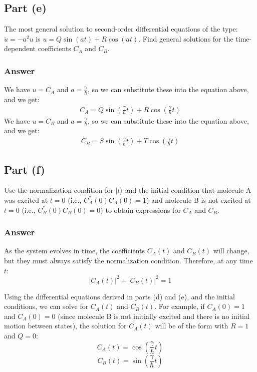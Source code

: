 \documentclass{article}
\begin{document}
\subsection{Part (e)}
The most general solution to second-order differential equations of the type: \(\ddot{u} = -a^2u\) is \( u = Q \sin(at) + R \cos(at) \). Find general solutions for the time-dependent coefficients \(C_A\) and \(C_B\).
\subsubsection{Answer}
We have $u = C_A$ and $a = \frac{\gamma}{\hbar}$, so we can substitute these into the equation above, and we get:
\begin{align}
C_A = Q \sin \left( \frac{\gamma}{\hbar} t \right) + R \cos \left( \frac{\gamma}{\hbar} t \right)
\end{align}
We have $u = C_B$ and $a = \frac{\gamma}{\hbar}$, so we can substitute these into the equation above, and we get:
\begin{align}
C_B = S \sin \left( \frac{\gamma}{\hbar} t \right) + T \cos \left( \frac{\gamma}{\hbar} t \right)
\end{align}

\subsection{Part (f)}
Use the normalization condition for \( \lvert t \rangle \) and the initial condition that molecule A was excited at \( t = 0 \) (i.e., \( C_A^*(0)C_A(0) = 1 \)) and molecule B is not excited at \( t = 0 \) (i.e., \( C_B^*(0)C_B(0) = 0 \)) to obtain expressions for \(C_A\) and \(C_B\).
\subsubsection{Answer}

As the system evolves in time, the coefficients \( C_A(t) \) and \( C_B(t) \) will change, but they must always satisfy the normalization condition. Therefore, at any time \( t \):
\begin{equation}
\lvert C_A(t) \rvert^2 + \lvert C_B(t) \rvert^2 = 1
\end{equation}

Using the differential equations derived in parts (d) and (e), and the initial conditions, we can solve for \( C_A(t) \) and \( C_B(t) \). For example, if \( C_A(0) = 1 \) and \( \dot{C}_A(0) = 0 \) (since molecule B is not initially excited and there is no initial motion between states), the solution for \( C_A(t) \) will be of the form with \( R = 1 \) and \( Q = 0 \):
\begin{equation}
\boxed{C_A(t) = \cos\left(\frac{\gamma}{\hbar}t\right)}
\end{equation}
\begin{equation}
\boxed{C_B(t) = \sin\left(\frac{\gamma}{\hbar}t\right)}
\end{equation}
\end{document}
